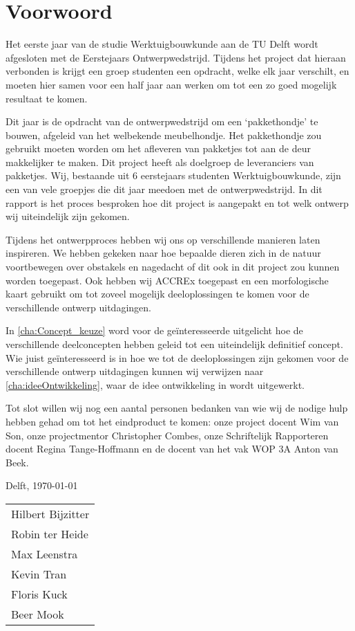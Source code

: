 \chapter*{Voorwoord}
\label{cha:voorwoord}

Het eerste jaar van de studie Werktuigbouwkunde aan de TU Delft wordt afgesloten met de  Eerstejaars Ontwerpwedstrijd. Tijdens het project dat hieraan verbonden is krijgt een groep studenten een opdracht, welke elk jaar verschilt, en moeten hier samen voor een half jaar aan werken om tot een zo goed mogelijk resultaat te komen. 

Dit jaar is de opdracht van de ontwerpwedstrijd om een ‘pakkethondje’ te bouwen, afgeleid van het welbekende meubelhondje. Het pakkethondje zou gebruikt moeten worden om het afleveren van pakketjes tot aan de deur makkelijker te maken. Dit project heeft als doelgroep de leveranciers van pakketjes. Wij, bestaande uit 6 eerstejaars studenten Werktuigbouwkunde, zijn een van vele groepjes die dit jaar meedoen met de ontwerpwedstrijd. In dit rapport is het proces besproken hoe dit project is aangepakt en tot welk ontwerp wij uiteindelijk zijn gekomen.

Tijdens het ontwerpproces hebben wij ons op verschillende manieren laten inspireren. We hebben gekeken naar hoe bepaalde dieren zich in de natuur voortbewegen over obstakels en nagedacht of dit ook in dit project zou kunnen worden toegepast. Ook hebben wij ACCREx toegepast en een morfologische kaart gebruikt om tot zoveel mogelijk deeloplossingen te komen voor de verschillende ontwerp uitdagingen.

In \cref{cha:Concept_keuze} word voor de geïnteresseerde uitgelicht hoe de verschillende deelconcepten hebben geleid tot een uiteindelijk definitief concept. Wie juist geïnteresseerd is in hoe we tot de deeloplossingen zijn gekomen voor de verschillende ontwerp uitdagingen kunnen wij verwijzen naar \cref{cha:ideeOntwikkeling}, waar de idee ontwikkeling in wordt uitgewerkt.

Tot slot willen wij nog een aantal personen bedanken van wie wij de nodige hulp hebben gehad om tot het eindproduct te komen: onze project docent Wim van Son, onze projectmentor Christopher Combes, onze Schriftelijk Rapporteren docent Regina Tange-Hoffmann en de docent van het vak WOP 3A Anton van Beek.

\vspace{\baselineskip}
Delft, \today\\
\begin{table}[h]
    \begin{tabular}{l}
        Hilbert Bijzitter\\
        Robin ter Heide\\
        Max Leenstra\\
        Kevin Tran\\
        Floris Kuck\\
        Beer Mook
    \end{tabular}
\end{table}

\vspace{\baselineskip}


